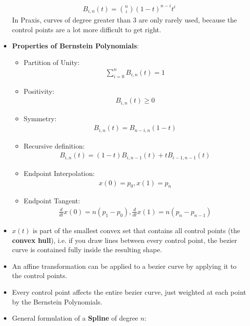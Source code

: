 \documentclass{scrartcl}
\begin{document}
\begin{itemize}
    \begin{align*}
        B_{i,n}(t) = \binom{n}{i}(1-t)^{n-i}t^i
    \end{align*}
    In Praxis, curves of degree greater than $3$ are only rarely used, because the control points are a lot more difficult to get right.
    \item \textbf{Properties of Bernstein Polynomials}:
    \begin{itemize}
        \item Partition of Unity: 
        \begin{align*}
            \sum^{n}_{i=0} B_{i,n}(t) = 1
        \end{align*}
        \item Positivity:
        \begin{align*}
            B_{i,n}(t) \geq 0
        \end{align*}
        \item Symmetry:
        \begin{align*}
            B_{i,n}(t) = B_{n-i,n}(1-t)
        \end{align*}
        \item Recursive definition:
        \begin{align*}
            B_{i,n}(t) = (1-t)B_{i,n-1}(t) + tB_{i-1,n-1}(t)
        \end{align*}
        \item Endpoint Interpolation:
        \begin{align*}
            x(0) = p_0, x(1) = p_n
        \end{align*}
        \item Endpoint Tangent:
        \begin{align*}
            \frac{d}{dt} x(0) = n(p_1-p_0), \frac{d}{dt} x(1) = n(p_n-p_{n-1})
        \end{align*}
    \end{itemize}
    \item $x(t)$ is part of the smallest convex set that contains all control points (the \textbf{convex hull}), i.e. if you draw lines between every control point, the bezier curve is contained fully inside the resulting shape.
    \item An affine transformation can be applied to a bezier curve by applying it to the control points.
    \item Every control point affects the entire bezier curve, just weighted at each point by the Bernstein Polynomials.
    \item General formulation of a \textbf{Spline} of degree $n$:

\end{itemize}
\end{document}
